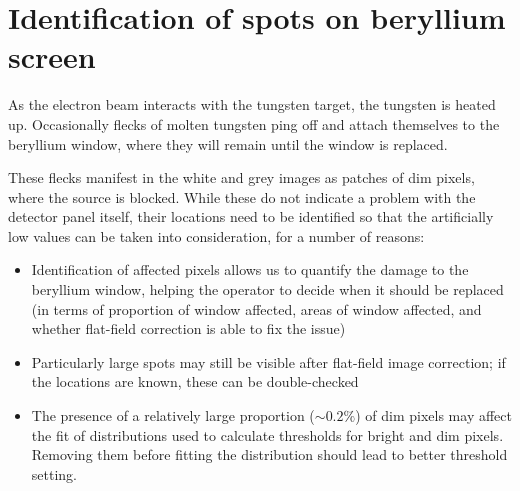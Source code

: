 \documentclass[10pt,fleqn]{article}
\begin{document}


\section*{Identification of spots on beryllium screen}

As the electron beam interacts with the tungsten target, the tungsten is heated up. Occasionally flecks of molten tungsten ping off and attach themselves to the beryllium window, where they will remain until the window is replaced.

These flecks manifest in the white and grey images as patches of dim pixels, where the source is blocked. While these do not indicate a problem with the detector panel itself, their locations need to be identified so that the artificially low values can be taken into consideration, for a number of reasons:
\begin{itemize}
\item Identification of affected pixels allows us to quantify the damage to the beryllium window, helping the operator to decide when it should be replaced (in terms of proportion of window affected, areas of window affected, and whether flat-field correction is able to fix the issue)

\item Particularly large spots may still be visible after flat-field image correction; if the locations are known, these can be double-checked

\item The presence of a relatively large proportion ($\sim 0.2\%$) of dim pixels may affect the fit of distributions used to calculate thresholds for bright and dim pixels. Removing them before fitting the distribution should lead to better threshold setting. 
\end{itemize}


\end{document}
